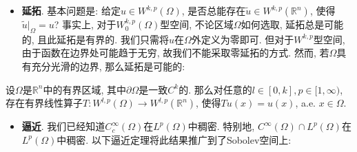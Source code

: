 \begin{itemize}
    \item \textbf{延拓}. 基本问题是: 给定$u \in W^{k, p}(\Omega)$, 是否总能存在$\widetilde{u} \in W^{k, p}(\mathbb{R}^n)$, 使得$\widetilde{u}|_{\Omega} = u$?
    事实上, 对于$W_0^{k, p}(\Omega)$型空间, 不论区域$\Omega$如何选取, 延拓总是可能的, 且此延拓是有界的.
    我们只需将$u$在$\Omega$外定义为零即可. 但对于$W^{k, p}$型空间, 由于函数在边界处可能趋于无穷, 故我们不能采取零延拓的方式.
    然而, 若$\Omega$具有充分光滑的边界, 那么延拓是可能的:
\end{itemize}

\begin{theorem}
    设$\Omega$是$\mathbb{R}^n$中的有界区域, 其中$\partial\Omega$是一致$C^k$的.
    那么对任意的$l \in [0, k], p \in [1, \infty)$, 存在有界线性算子$T\colon W^{l, p}(\Omega) \rightarrow W^{l, p}(\mathbb{R}^n)$, 使得$Tu(x) = u(x)$, a.e. $x \in \Omega$.
\end{theorem}

\begin{itemize}
    \item \textbf{逼近}. 我们已经知道$C_c^{\infty}(\Omega)$在$L^p(\Omega)$中稠密. 特别地, $C^{\infty}(\Omega) \cap L^p(\Omega)$在$L^p(\Omega)$中稠密.
    以下逼近定理将此结果推广到了Sobolev空间上: 
\end{itemize}

